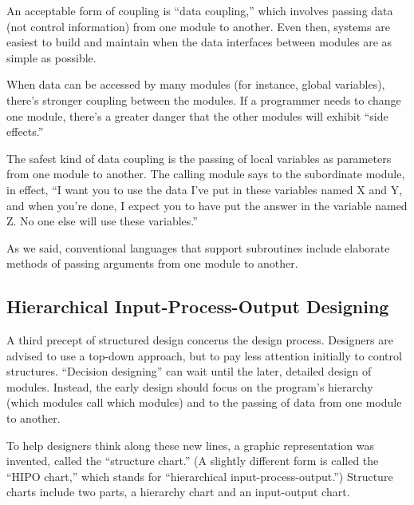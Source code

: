 An acceptable form of coupling is ``data coupling,''
which involves passing data (not control information) from one module
to another.  Even then, systems are easiest to build and maintain when
the data interfaces between modules are as simple as possible.

When data can be accessed by many modules (for instance, global
variables), there's stronger coupling between the modules. If a
programmer needs to change one module, there's a greater danger that
the other modules will exhibit ``side effects.''

The safest kind of data coupling is the passing of local variables as
parameters from one module to another. The calling module says to the
subordinate module, in effect, ``I want you to use the data I've put
in these variables named X and Y, and when you're done, I expect you
to have put the answer in the variable named Z. No one else will use
these variables.''

As we said, conventional languages that support subroutines include
elaborate methods of passing arguments from one module to another.


\subsection{Hierarchical Input-Process-Output Designing}
A third precept of structured design concerns the design process.
Designers are advised to use a top-down approach, but to pay less
attention initially to control structures. ``Decision designing'' can
wait until the later, detailed design of modules. Instead, the early
design should focus on the program's hierarchy (which modules call
which modules) and to the passing of data from one module to another.

To help designers think along these new lines, a graphic
representation was invented, called the ``structure chart.''
(A slightly different form is called the ``HIPO chart,'' which stands
for ``hierarchical input-process-output.'') Structure charts include
two parts, a hierarchy chart and an input-output chart.


